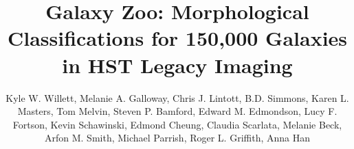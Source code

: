 \documentclass[twocolumn]{aastex6}
\begin{document}

\title{Galaxy Zoo: Morphological Classifications for 150,000 Galaxies in HST Legacy Imaging}

\author{Kyle W. Willett, Melanie A. Galloway, Chris J. Lintott, B.D. Simmons, Karen L. Masters, Tom Melvin, Steven P. Bamford, Edward M. Edmondson, Lucy F. Fortson, Kevin Schawinski, Edmond Cheung, Claudia Scarlata, Melanie Beck, Arfon M. Smith, Michael Parrish, Roger L. Griffith, Anna Han
}
%
%
\end{document}
